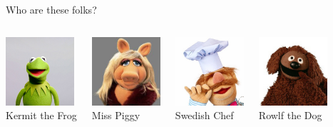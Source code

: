 \documentclass{beamer}\usepackage[]{graphicx}\usepackage[]{color}
\begin{document}
\begin{darkframes}
\begin{frame}{Who are these folks?}
  \begin{columns}[onlytextwidth]
      \begin{center}
        \includegraphics[width=1in]{kermitthefrog} \\
        Kermit the Frog
      \end{center}
      \begin{center}
        \includegraphics[width=1in]{misspiggy} \\
        Miss Piggy
      \end{center}
      \begin{center}
        \includegraphics[width=1in]{swedishchef} \\
        Swedish Chef
      \end{center}
      \begin{center}
        \includegraphics[width=1in]{rowlf} \\
        Rowlf the Dog
      \end{center}
  \end{columns}
  \smallskip
  \begin{columns}[onlytextwidth]
      \begin{center}

\end{center}
\end{columns}
\end{frame}
\end{darkframes}
\end{document}
